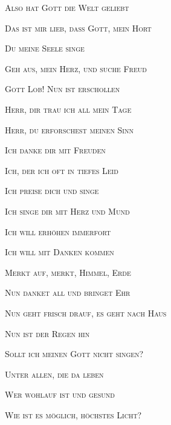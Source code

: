 \documentclass{book}
\begin{document}

\centerline{\scshape Also hat Gott die Welt geliebt}
\vspace*{0.8\baselineskip}
\centerline{\scshape Das ist mir lieb, daß Gott, mein Hort}
\vspace*{0.8\baselineskip}
\centerline{\scshape Du meine Seele singe}
\vspace*{0.8\baselineskip}
\centerline{\scshape Geh aus, mein Herz, und suche Freud}
\vspace*{0.8\baselineskip}
\centerline{\scshape Gott Lob! Nun ist erschollen}                %
\vspace*{0.8\baselineskip}
\centerline{\scshape Herr, dir trau ich all mein Tage}
\vspace*{0.8\baselineskip}
\centerline{\scshape Herr, du erforschest meinen Sinn}
\vspace*{0.8\baselineskip}
\centerline{\scshape Ich danke dir mit Freuden}
\vspace*{0.8\baselineskip}
\centerline{\scshape Ich, der ich oft in tiefes Leid}
\vspace*{0.8\baselineskip}
\centerline{\scshape Ich preise dich und singe}
\vspace*{0.8\baselineskip}
\centerline{\scshape Ich singe dir mit Herz und Mund}
\vspace*{0.8\baselineskip}
\centerline{\scshape Ich will erhöhen immerfort}
\vspace*{0.8\baselineskip}
\centerline{\scshape Ich will mit Danken kommen}
\vspace*{0.8\baselineskip}
\centerline{\scshape Merkt auf, merkt, Himmel, Erde}
\vspace*{0.8\baselineskip}
\centerline{\scshape Nun danket all und bringet Ehr}
\vspace*{0.8\baselineskip}
\centerline{\scshape Nun geht frisch drauf, es geht nach Haus}
\vspace*{0.8\baselineskip}
\centerline{\scshape Nun ist der Regen hin}
\vspace*{0.8\baselineskip}
\centerline{\scshape Sollt ich meinen Gott nicht singen?}
\vspace*{0.8\baselineskip}
\centerline{\scshape Unter allen, die da leben}                %
\vspace*{0.8\baselineskip}
\centerline{\scshape Wer wohlauf ist und gesund}
\vspace*{0.8\baselineskip}
\centerline{\scshape Wie ist es möglich, höchstes Licht?}
\end{document}
